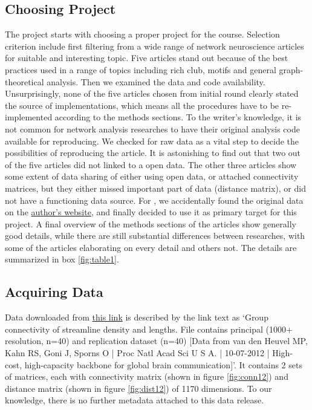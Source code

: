 \documentclass{article}
\begin{document}
\subsection*{Choosing Project}
The project starts with choosing a proper project for the course. Selection criterion include first filtering from a wide range of network neuroscience articles for suitable and interesting topic. Five articles \cite{heuvel_high-cost_2012, heuvel_rich-club_2011, harriger_rich_2012, rubinov_wiring_2015, shen_information_2012} stand out because of the best practices used in a range of topics including rich club, motifs and general graph-theoretical analysis.
Then we examined the data and code availability. Unsurprisingly, none of the five articles chosen from initial round clearly stated the source of implementations, which means all the procedures have to be re-implemented according to the methods sections. To the writer's knowledge, it is not common for network analysis researches to have their original analysis code available for reproducing. 
We checked for raw data as a vital step to decide the possibilities of reproducing the article. It is astonishing to find out that two out of the five articles did not linked to a open data. The other three articles show some extent of data sharing of either using open data, or attached connectivity matrices, but they either missed important part of data (distance matrix), or did not have a functioning data source. For \cite{heuvel_high-cost_2012}, we accidentally found the original data on the  \href{http://www.dutchconnectomelab.nl/index.php#downloads}{author's website}, and finally decided to use it as primary target for this project.
A final overview of the methods sections of the articles show generally good details, while there are still substantial differences between researches, with some of the articles elaborating on every detail and others not.
The details are summarized in box \ref{fig:table1}.

\subsection*{Acquiring Data}
Data downloaded from \href{http://www.dutchconnectomelab.nl/wordpress/wp-content/uploads/GR_Dataset_n2x40.mat}{this link} is described by the link text as `Group connectivity of streamline density and lengths. File contains principal (1000+ resolution, n=40) and replication dataset (n=40) [Data from van den Heuvel MP, Kahn RS, Goni J, Sporns O | Proc Natl Acad Sci U S A. | 10-07-2012 | High-cost, high-capacity backbone for global brain communication]'. It contains 2 sets of matrices, each with connectivity matrix (shown in figure \ref{fig:conn12}) and distance matrix (shown in figure \ref{fig:dist12}) of 1170 dimensions. To our knowledge, there is no further metadata attached to this data release.
\end{document}
